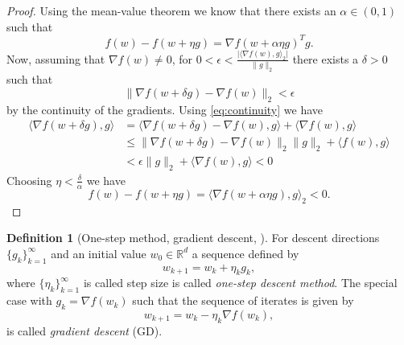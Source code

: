 \documentclass[12pt]{article}
\theoremstyle{definition}
\newtheorem{definition}[definition]{Definition}
\numberwithin{equation}{section}
\newcommand{\norm}[1]{\lVert{#1}\rVert_2}
\newcommand{\scp}[2]{\langle{#1}, {#2}\rangle_2}
\begin{document}
\begin{proof}
  Using the mean-value theorem we know that there exists an $\alpha \in (0,1)$ such that 
  \begin{equation}
    f(w) - f(w + \eta g) = \nabla f(w+\alpha\eta g)^Tg.
  \end{equation}
  Now, assuming that $\nabla f (w) \neq 0$, for $0 < \epsilon <
  \frac{\lvert\scp{\nabla f(w)}{g}\rvert}{\norm{g}}$ there exists a $\delta > 0$ such that 
  \begin{equation}
    \label{eq:continuity}
    \norm{\nabla f(w + \delta g) - \nabla f(w)} < \epsilon
  \end{equation}
  by the continuity of the gradients.
  Using \eqref{eq:continuity} we have
  \begin{equation}
    \begin{split}
      \langle\nabla f(w + \delta g), g \rangle &= \langle \nabla f(w + \delta g)- \nabla f(w), g \rangle + \langle \nabla f(w), g \rangle \\
      &\leq \norm{\nabla f(w + \delta g)- \nabla f(w)}\norm{g} + \langle f(w), g \rangle \\
      &< \epsilon \norm{g} + \langle \nabla f(w), g \rangle < 0
    \end{split}
  \end{equation}
  Choosing $\eta < \frac{\delta}{\alpha}$ we have
  \begin{equation}
    f(w) - f(w + \eta g) = \scp{\nabla f(w+\alpha\eta g)}{g} < 0.
  \end{equation}
\end{proof}
\begin{definition}[One-step method, gradient descent, ]
  For descent directions $\{g_k\}_{k=1}^\infty$ and an initial value $w_{0}\in \mathbb{R}^d$ a sequence defined by
\begin{equation}
  w_{k+1} = w_{k} + \eta_k g_k,
\end{equation}
  where $\{\eta_k\}_{k=1}^\infty$ is called step size is called \emph{one-step descent method}. The special case with $g_k = \nabla f(w_k)$ such that the sequence of iterates is given by
  \begin{equation}
    \label{eq:gradient_descent}
    w_{k+1} = w_{k} - \eta_k \nabla f(w_{k}),
  \end{equation}
  is called \emph{gradient descent} (GD).
\end{definition}
\end{document}
